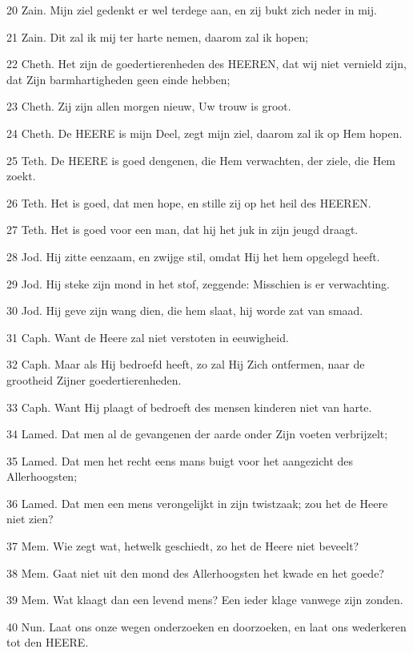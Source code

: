 \par 20 Zain. Mijn ziel gedenkt er wel terdege aan, en zij bukt zich neder in mij.
\par 21 Zain. Dit zal ik mij ter harte nemen, daarom zal ik hopen;
\par 22 Cheth. Het zijn de goedertierenheden des HEEREN, dat wij niet vernield zijn, dat Zijn barmhartigheden geen einde hebben;
\par 23 Cheth. Zij zijn allen morgen nieuw, Uw trouw is groot.
\par 24 Cheth. De HEERE is mijn Deel, zegt mijn ziel, daarom zal ik op Hem hopen.
\par 25 Teth. De HEERE is goed dengenen, die Hem verwachten, der ziele, die Hem zoekt.
\par 26 Teth. Het is goed, dat men hope, en stille zij op het heil des HEEREN.
\par 27 Teth. Het is goed voor een man, dat hij het juk in zijn jeugd draagt.
\par 28 Jod. Hij zitte eenzaam, en zwijge stil, omdat Hij het hem opgelegd heeft.
\par 29 Jod. Hij steke zijn mond in het stof, zeggende: Misschien is er verwachting.
\par 30 Jod. Hij geve zijn wang dien, die hem slaat, hij worde zat van smaad.
\par 31 Caph. Want de Heere zal niet verstoten in eeuwigheid.
\par 32 Caph. Maar als Hij bedroefd heeft, zo zal Hij Zich ontfermen, naar de grootheid Zijner goedertierenheden.
\par 33 Caph. Want Hij plaagt of bedroeft des mensen kinderen niet van harte.
\par 34 Lamed. Dat men al de gevangenen der aarde onder Zijn voeten verbrijzelt;
\par 35 Lamed. Dat men het recht eens mans buigt voor het aangezicht des Allerhoogsten;
\par 36 Lamed. Dat men een mens verongelijkt in zijn twistzaak; zou het de Heere niet zien?
\par 37 Mem. Wie zegt wat, hetwelk geschiedt, zo het de Heere niet beveelt?
\par 38 Mem. Gaat niet uit den mond des Allerhoogsten het kwade en het goede?
\par 39 Mem. Wat klaagt dan een levend mens? Een ieder klage vanwege zijn zonden.
\par 40 Nun. Laat ons onze wegen onderzoeken en doorzoeken, en laat ons wederkeren tot den HEERE.
